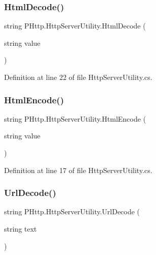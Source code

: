 \subsubsection{\texorpdfstring{Html\+Decode()}{HtmlDecode()}}
{\footnotesize\ttfamily string P\+Http.\+Http\+Server\+Utility.\+Html\+Decode (\begin{DoxyParamCaption}\item[{string}]{value }\end{DoxyParamCaption})}



Definition at line 22 of file Http\+Server\+Utility.\+cs.

\mbox{\label{class_p_http_1_1_http_server_utility_a733ed2ef78dd3eb9ae35f4881567c9b1}} 
\subsubsection{\texorpdfstring{Html\+Encode()}{HtmlEncode()}}
{\footnotesize\ttfamily string P\+Http.\+Http\+Server\+Utility.\+Html\+Encode (\begin{DoxyParamCaption}\item[{string}]{value }\end{DoxyParamCaption})}



Definition at line 17 of file Http\+Server\+Utility.\+cs.

\mbox{\label{class_p_http_1_1_http_server_utility_aeda44a482b61e231671d0ac340cfc089}} 
\subsubsection{\texorpdfstring{Url\+Decode()}{UrlDecode()}\hspace{0.1cm}{\footnotesize\ttfamily [1/2]}}
{\footnotesize\ttfamily string P\+Http.\+Http\+Server\+Utility.\+Url\+Decode (\begin{DoxyParamCaption}\item[{string}]{text }\end{DoxyParamCaption})}




